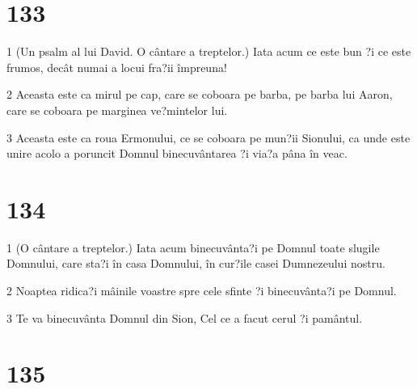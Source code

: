 \chapter{133}

\par 1 (Un psalm al lui David. O cântare a treptelor.) Iata acum ce este bun ?i ce este frumos, decât numai a locui fra?ii împreuna!
\par 2 Aceasta este ca mirul pe cap, care se coboara pe barba, pe barba lui Aaron, care se coboara pe marginea ve?mintelor lui.
\par 3 Aceasta este ca roua Ermonului, ce se coboara pe mun?ii Sionului, ca unde este unire acolo a poruncit Domnul binecuvântarea ?i via?a pâna în veac.

\chapter{134}

\par 1 (O cântare a treptelor.) Iata acum binecuvânta?i pe Domnul toate slugile Domnului, care sta?i în casa Domnului, în cur?ile casei Dumnezeului nostru.
\par 2 Noaptea ridica?i mâinile voastre spre cele sfinte ?i binecuvânta?i pe Domnul.
\par 3 Te va binecuvânta Domnul din Sion, Cel ce a facut cerul ?i pamântul.

\chapter{135}


